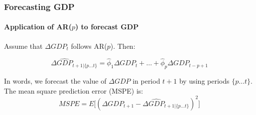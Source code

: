\begin{frame}
    \frametitle{Forecasting GDP}
    \framesubtitle{Application of AR($p$) to forecast GDP}
    Assume that ${\Delta GDP}_t$ follows AR($p$). Then:

    $${\Delta \hat{GDP}}_{t+1|\{p \ldots t\}} =\hat{\phi}_{1}{\Delta GDP}_{t}+\ldots+\hat{\phi}_{p}{\Delta GDP}_{t-p+1}$$

    In words, we forecast the value of ${\Delta GDP}$ in period $t+1$ by using periods $\{p \ldots t\}$.
    \newline \newline
    The mean square prediction error (MSPE) is:
    $$MSPE = E\big[ ({\Delta GDP}_{t+1} - {\Delta \hat{GDP}}_{t+1|\{p \ldots t\}})^2 \big]$$
\end{frame}